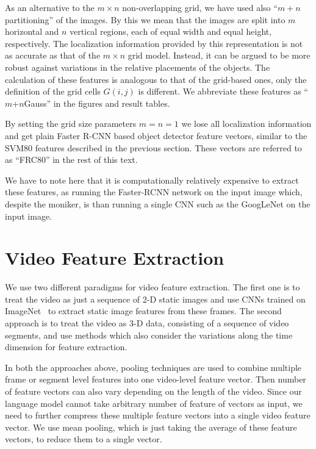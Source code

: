 As an alternative to the $m\times n$ non-overlapping grid, we have used also
``$m+n$ partitioning'' of the images.
By this we mean that the images are split into $m$ horizontal and $n$ vertical
regions, each of equal width and equal height, respectively.
The localization information provided by this representation is not as accurate
as that of the $m\times n$ grid model.
Instead, it can be argued to be more robust against variations in the relative
placements of the objects.
The calculation of these features is analogous to that of the grid-based ones,
only the definition of the grid cells $G(i,j)$ is different.
We abbreviate these features as ``$m$+$n$Gauss'' in the figures and result
tables.

By setting the grid size parameters $m=n=1$ we lose all localization information
and get plain Faster R-CNN based object detector feature vectors, similar to the SVM80
features described in the previous section.
These vectors are referred to as ``FRC80'' in the rest of this text. 

We have to note here that it is computationally relatively expensive to extract
these features, as  running the Faster-RCNN network on the input image which,
despite the moniker, is  than running a single CNN such as the
GoogLeNet on the input image.

\section{Video Feature Extraction}
\label{sec:VideoFeat}
We use two different paradigms for video feature extraction.
The first one is to treat the video as just a sequence of 2-D static images and
use CNNs trained on ImageNet~\cite{ImagenetOrig} to extract static image
features from these frames.
The second approach is to treat the video as 3-D data, consisting of a
sequence of video segments, and use methods which also consider the variations
along the time dimension for feature extraction.

In both the approaches above, pooling techniques are used to combine multiple
frame or segment level features into one video-level feature vector.
Then number of feature vectors can also vary depending on the length of the
video.
Since our language model cannot take arbitrary number of feature of vectors as
input, we need to further compress these multiple feature vectors into a single
video feature vector. 
We use mean pooling, which is just taking the average of these feature vectors,
to reduce them to a single vector.

